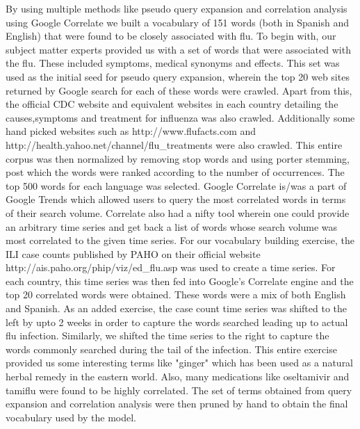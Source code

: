 
By using multiple methods like pseudo query expansion and correlation analysis using Google Correlate we built a vocabulary of 151 words (both in Spanish and English) that were found to be closely associated with flu. To begin with, our subject matter experts provided us with a set of words that were associated with the flu. These included symptoms, medical synonyms and effects. This set was used as the initial seed for pseudo query expansion, wherein the top 20 web sites returned by Google search for each of these words were crawled. Apart from this, the official CDC website and equivalent websites in each country detailing the causes,symptoms and treatment for influenza was also crawled. Additionally some hand picked websites such as http://www.flufacts.com and http://health.yahoo.net/channel/flu_treatments were also crawled. This entire corpus was then normalized by removing stop words and using porter stemming, post which the words were ranked according to the number of occurrences. The top 500 words for each language was selected. 
Google Correlate is/was a part of Google Trends which allowed users to query the most correlated words in terms of their search volume. Correlate also had a nifty tool wherein one could provide an arbitrary time series and get back a list of words whose search volume was most correlated to the given time series. For our vocabulary building exercise, the ILI case counts published by PAHO on their official website http://ais.paho.org/phip/viz/ed_flu.asp was used to create a time series. For each country, this time series was then fed into Google's Correlate engine and the top 20 correlated words were obtained. These words were a mix of both English and Spanish. As an added exercise, the case count time series was shifted to the left by upto 2 weeks in order to capture the words searched leading up to actual flu infection. Similarly, we shifted the time series to the right to capture the words commonly searched during the tail of the infection. This entire exercise provided us some interesting terms like "ginger" which has been used as a natural herbal remedy in the eastern world. Also, many medications like oseltamivir and tamiflu were found to be highly correlated.   
The set of terms obtained from query expansion and correlation analysis were then pruned by hand to obtain the final vocabulary used by the model. 
